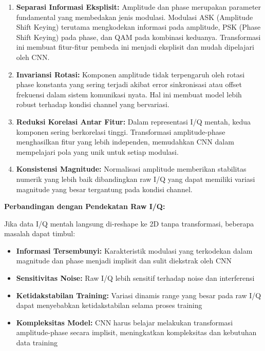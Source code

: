 \documentclass{article}
\begin{document}
\begin{enumerate}
    \item \textbf{Separasi Informasi Eksplisit:} Amplitude dan phase merupakan parameter fundamental yang membedakan jenis modulasi. Modulasi ASK (Amplitude Shift Keying) terutama mengkodekan informasi pada amplitude, PSK (Phase Shift Keying) pada phase, dan QAM pada kombinasi keduanya. Transformasi ini membuat fitur-fitur pembeda ini menjadi eksplisit dan mudah dipelajari oleh CNN.
    
    \item \textbf{Invariansi Rotasi:} Komponen amplitude tidak terpengaruh oleh rotasi phase konstanta yang sering terjadi akibat error sinkronisasi atau offset frekuensi dalam sistem komunikasi nyata. Hal ini membuat model lebih robust terhadap kondisi channel yang bervariasi.
    
    \item \textbf{Reduksi Korelasi Antar Fitur:} Dalam representasi I/Q mentah, kedua komponen sering berkorelasi tinggi. Transformasi amplitude-phase menghasilkan fitur yang lebih independen, memudahkan CNN dalam mempelajari pola yang unik untuk setiap modulasi.
    
    \item \textbf{Konsistensi Magnitude:} Normalisasi amplitude memberikan stabilitas numerik yang lebih baik dibandingkan raw I/Q yang dapat memiliki variasi magnitude yang besar tergantung pada kondisi channel.
\end{enumerate}

\textbf{Perbandingan dengan Pendekatan Raw I/Q:}

Jika data I/Q mentah langsung di-reshape ke 2D tanpa transformasi, beberapa masalah dapat timbul:
\begin{itemize}
    \item \textbf{Informasi Tersembunyi:} Karakteristik modulasi yang terkodekan dalam magnitude dan phase menjadi implisit dan sulit diekstrak oleh CNN
    \item \textbf{Sensitivitas Noise:} Raw I/Q lebih sensitif terhadap noise dan interferensi
    \item \textbf{Ketidakstabilan Training:} Variasi dinamis range yang besar pada raw I/Q dapat menyebabkan ketidakstabilan selama proses training
    \item \textbf{Kompleksitas Model:} CNN harus belajar melakukan transformasi amplitude-phase secara implisit, meningkatkan kompleksitas dan kebutuhan data training
\end{itemize}
\newpage
\end{document}
